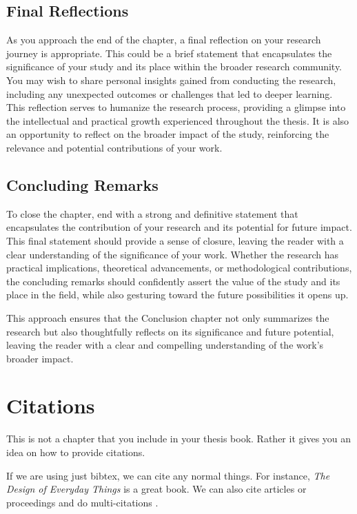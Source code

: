 \documentclass{iutbscthesis}
\begin{document}
\section{Final Reflections}

As you approach the end of the chapter, a final reflection on your research journey is appropriate. This could be a brief statement that encapsulates the significance of your study and its place within the broader research community. You may wish to share personal insights gained from conducting the research, including any unexpected outcomes or challenges that led to deeper learning. This reflection serves to humanize the research process, providing a glimpse into the intellectual and practical growth experienced throughout the thesis. It is also an opportunity to reflect on the broader impact of the study, reinforcing the relevance and potential contributions of your work.

\section{Concluding Remarks}

To close the chapter, end with a strong and definitive statement that encapsulates the contribution of your research and its potential for future impact. This final statement should provide a sense of closure, leaving the reader with a clear understanding of the significance of your work. Whether the research has practical implications, theoretical advancements, or methodological contributions, the concluding remarks should confidently assert the value of the study and its place in the field, while also gesturing toward the future possibilities it opens up.

This approach ensures that the Conclusion chapter not only summarizes the research but also thoughtfully reflects on its significance and future potential, leaving the reader with a clear and compelling understanding of the work's broader impact.

\chapter{Citations} \label{chapter:citations}
This is not a chapter that you include in your thesis book. Rather it gives you an idea on how to provide citations.

If we are using just bibtex, we can cite any normal things. For instance, \emph{The Design of Everyday Things} \cite{norman2013design} is a great book. We can also cite articles or proceedings and do multi-citations \cite{chao2023multimagCNN, mackenzie1992extending, 1careage2023intrinsic}.
\end{document}

